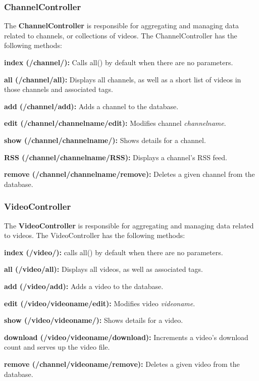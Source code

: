 \documentclass[a4paper,12pt]{report}
\begin{document}
\subsubsection{ChannelController}
The \textbf{ChannelController} is responsible for aggregating and managing data related to channels, or collections of videos. The ChannelController has the following methods:
\begin{description}
\item{\textbf{index (/channel/): } Calls all() by default when there are no parameters.}
\item{\textbf{all (/channel/all): } Displays all channels, as well as a short list of videos in those channels and associated tags.}
\item{\textbf{add (/channel/add): } Adds a channel to the database.}
\item{\textbf{edit (/channel/channelname/edit): } Modifies channel \textit{channelname}.}
\item{\textbf{show (/channel/channelname/): } Shows details for a channel.}
\item{\textbf{RSS (/channel/channelname/RSS): } Displays a channel's RSS feed.}
\item{\textbf{remove (/channel/channelname/remove): } Deletes a given channel from the database.} \\
\end{description} 

\subsubsection{VideoController}
The \textbf{VideoController} is responsible for aggregating and managing data related to videos. The VideoController has the following methods:
\begin{description}
\item{\textbf{index (/video/): } calls all() by default when there are no parameters.}
\item{\textbf{all (/video/all): } Displays all videos, as well as associated tags.}
\item{\textbf{add (/video/add): } Adds a video to the database.}
\item{\textbf{edit (/video/videoname/edit): } Modifies video \textit{videoname}.}
\item{\textbf{show (/video/videoname/): } Shows details for a video.}
\item{\textbf{download (/video/videoname/download): } Increments a video's download count and serves up the video file.}
\item{\textbf{remove (/channel/videoname/remove): } Deletes a given video from the database.} \\
\end{description} 
\end{document}
